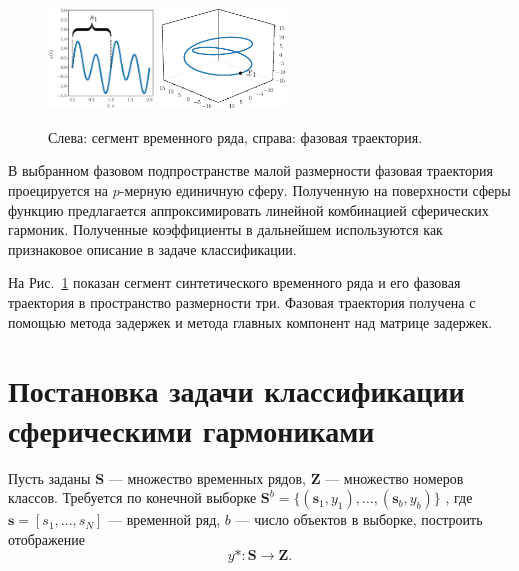 \documentclass[12pt,twoside]{article}
\begin{document}
\begin{figure}[h]
\centering
  {\includegraphics[width=0.25\textwidth]{figs/synthetic_example.eps}}
  {\includegraphics[width=0.3\textwidth]{figs/synthetic_trajectory.eps}}\\
\caption{Слева: сегмент временного ряда, справа: фазовая траектория.}
\label{fg:initial_traj}
\end{figure}

В выбранном фазовом подпространстве малой размерности фазовая траектория проецируется на $p$-мерную единичную сферу.
Полученную на поверхности сферы функцию предлагается аппроксимировать линейной комбинацией сферических гармоник.
Полученные коэффициенты в дальнейшем используются как признаковое описание в задаче классификации.

На Рис.~\ref{fg:initial_traj} показан сегмент синтетического временного ряда и его фазовая траектория в пространство размерности три.
Фазовая траектория получена с помощью метода задержек и метода главных компонент над матрице задержек.

\section{Постановка задачи классификации сферическими гармониками}

Пусть заданы $\mathbf{S}$ --- множество временных рядов, $\mathbf{Z}$ --- множество номеров классов.
Требуется по конечной выборке $\mathbf{S}^{b} = \{(\mathbf{s}_1, y_1),\dots,(\mathbf{s}_{b}, y_{b}) \}$ , где  $\mathbf{s}=[s_1,...,s_N]$ --- временной ряд, $b$ --- число объектов в выборке, построить отображение
\begin{equation}
y*:\mathbf{S} \xrightarrow{} \mathbf{Z}.
\label{eq:y*}
\end{equation}
\end{document}
